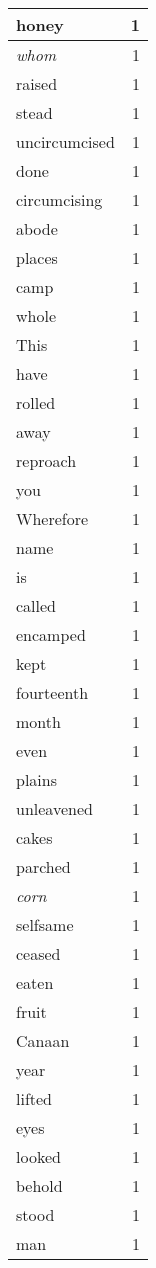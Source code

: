 \begin{center}
\begin{longtable}{l|r}
honey & 1 \\ \hline
\emph{whom} & 1 \\ \hline
raised & 1 \\ \hline
stead & 1 \\ \hline
uncircumcised & 1 \\ \hline
done & 1 \\ \hline
circumcising & 1 \\ \hline
abode & 1 \\ \hline
places & 1 \\ \hline
camp & 1 \\ \hline
whole & 1 \\ \hline
This & 1 \\ \hline
have & 1 \\ \hline
rolled & 1 \\ \hline
away & 1 \\ \hline
reproach & 1 \\ \hline
you & 1 \\ \hline
Wherefore & 1 \\ \hline
name & 1 \\ \hline
is & 1 \\ \hline
called & 1 \\ \hline
encamped & 1 \\ \hline
kept & 1 \\ \hline
fourteenth & 1 \\ \hline
month & 1 \\ \hline
even & 1 \\ \hline
plains & 1 \\ \hline
unleavened & 1 \\ \hline
cakes & 1 \\ \hline
parched & 1 \\ \hline
\emph{corn} & 1 \\ \hline
selfsame & 1 \\ \hline
ceased & 1 \\ \hline
eaten & 1 \\ \hline
fruit & 1 \\ \hline
Canaan & 1 \\ \hline
year & 1 \\ \hline
lifted & 1 \\ \hline
eyes & 1 \\ \hline
looked & 1 \\ \hline
behold & 1 \\ \hline
stood & 1 \\ \hline
man & 1 \\ \hline

\end{longtable}
\end{center}
